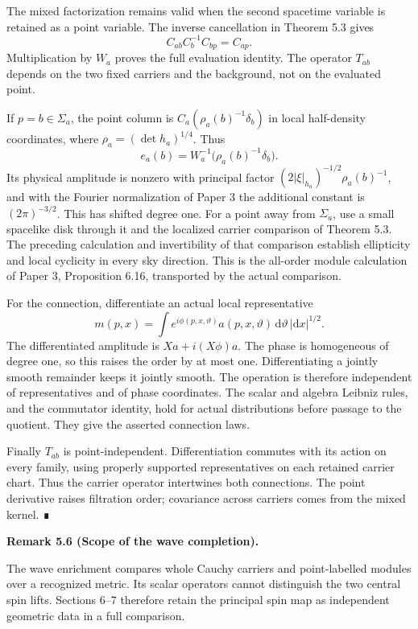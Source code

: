 \documentclass[
  english,
  11pt,
  reqno]{amsart}
\makeatletter
\newcommand{\pandocstatementheading}[1]{%
  \par\addpenalty{\@beginparpenalty}%
  \addvspace{.5\baselineskip plus .2\baselineskip minus .2\baselineskip}%
  {\normalfont\bfseries #1\par}%
  \nobreak\@afterindenttrue\@afterheading
}
\makeatother
\begin{document}
The mixed factorization remains valid when the second spacetime variable
is retained as a point variable. The inverse cancellation in Theorem 5.3
gives \[
C_{ab}C_b^{-1}C_{bp}=C_{ap}.
\] Multiplication by \(W_a\) proves the full evaluation identity. The
operator \(T_{ab}\) depends on the two fixed carriers and the
background, not on the evaluated point.

If \(p=b\in\Sigma_a\), the point column is
\(C_a(\rho_a(b)^{-1}\delta_b)\) in local half-density coordinates, where
\(\rho_a=(\det h_a)^{1/4}\). Thus \[
e_a(b)=W_a^{-1}\bigl(\rho_a(b)^{-1}\delta_b\bigr).
\] Its physical amplitude is nonzero with principal factor
\((2|\xi|_{h_a})^{-1/2}\rho_a(b)^{-1}\), and with the Fourier
normalization of Paper 3 the additional constant is \((2\pi)^{-3/2}\).
This has shifted degree one. For a point away from \(\Sigma_a\), use a
small spacelike disk through it and the localized carrier comparison of
Theorem 5.3. The preceding calculation and invertibility of that
comparison establish ellipticity and local cyclicity in every sky
direction. This is the all-order module calculation of Paper 3,
Proposition 6.16, transported by the actual comparison.

For the connection, differentiate an actual local representative \[
m(p,x)=\int e^{i\phi(p,x,\vartheta)}
a(p,x,\vartheta)\,\mathrm d\vartheta\,|\mathrm dx|^{1/2}.
\] The differentiated amplitude is \(Xa+i(X\phi)a\). The phase is
homogeneous of degree one, so this raises the order by at most one.
Differentiating a jointly smooth remainder keeps it jointly smooth. The
operation is therefore independent of representatives and of phase
coordinates. The scalar and algebra Leibniz rules, and the commutator
identity, hold for actual distributions before passage to the quotient.
They give the asserted connection laws.

Finally \(T_{ab}\) is point-independent. Differentiation commutes with
its action on every family, using properly supported representatives on
each retained carrier chart. Thus the carrier operator intertwines both
connections. The point derivative raises filtration order; covariance
across carriers comes from the mixed kernel. ∎

\pandocstatementheading{\protect{}\label{rem:scalar-completion-scope}Remark 5.6 (Scope of the wave completion).}

The wave enrichment compares whole Cauchy carriers and point-labelled
modules over a recognized metric. Its scalar operators cannot
distinguish the two central spin lifts. Sections 6--7 therefore retain
the principal spin map as independent geometric data in a full
comparison.
\end{document}
